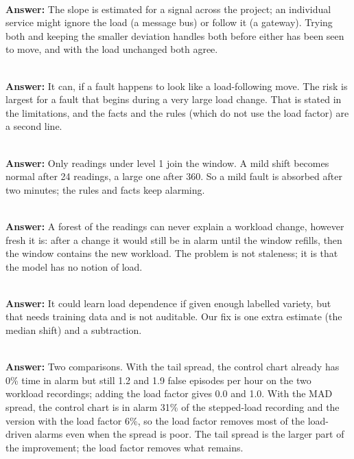 \\
\textbf{Answer:} The slope is estimated for a signal across the project; an individual service might ignore the load (a message bus) or follow it (a gateway). Trying both and keeping the smaller deviation handles both before either has been seen to move, and with the load unchanged both agree.

\\
\textbf{Answer:} It can, if a fault happens to look like a load-following move. The risk is largest for a fault that begins during a very large load change. That is stated in the limitations, and the facts and the rules (which do not use the load factor) are a second line.

\\
\textbf{Answer:} Only readings under level 1 join the window. A mild shift becomes normal after 24 readings, a large one after 360. So a mild fault is absorbed after two minutes; the rules and facts keep alarming.

\\
\textbf{Answer:} A forest of the readings can never explain a workload change, however fresh it is: after a change it would still be in alarm until the window refills, then the window contains the new workload. The problem is not staleness; it is that the model has no notion of load.

\\
\textbf{Answer:} It could learn load dependence if given enough labelled variety, but that needs training data and is not auditable. Our fix is one extra estimate (the median shift) and a subtraction.

\\
\textbf{Answer:} Two comparisons. With the tail spread, the control chart already has 0\% time in alarm but still 1.2 and 1.9 false episodes per hour on the two workload recordings; adding the load factor gives 0.0 and 1.0. With the MAD spread, the control chart is in alarm 31\% of the stepped-load recording and the version with the load factor 6\%, so the load factor removes most of the load-driven alarms even when the spread is poor. The tail spread is the larger part of the improvement; the load factor removes what remains.

